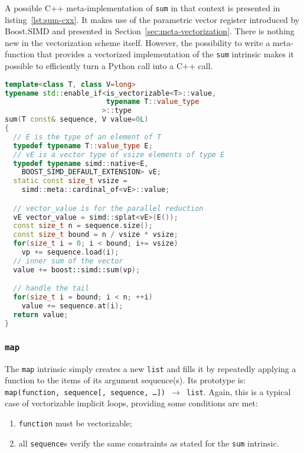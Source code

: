 \documentclass[preprint]{sigplanconf}
\begin{document}
A possible C++ meta-implementation of \texttt{sum} in that context is presented
in listing~\ref{lst:sum-cxx}. It makes use of the parametric vector register
introduced by Boost.SIMD and presented in Section~\ref{sec:meta-vectorization}.
There is nothing new in the vectorization scheme itself. However, the
possibility to write a meta-function that provides a vectorized implementation
of the \texttt{sum} intrinsic makes it possible to efficiently turn a Python
call into a C++ call.

\begin{lstlisting}[language=c++, label={lst:sum-cxx}, caption={Meta-implementation of the \texttt{sum} intrinsic in C++11.}]
template<class T, class V=long>
typename std::enable_if<is_vectorizable<T>::value,
                        typename T::value_type
                       >::type
sum(T const& sequence, V value=0L)
{
  // E is the type of an element of T
  typedef typename T::value_type E;
  // vE is a vector type of vsize elements of type E
  typedef typename simd::native<E,
    BOOST_SIMD_DEFAULT_EXTENSION> vE;
  static const size_t vsize =
    simd::meta::cardinal_of<vE>::value;

  // vector_value is for the parallel reduction
  vE vector_value = simd::splat<vE>(E());
  const size_t n = sequence.size();
  const size_t bound = n / vsize * vsize;
  for(size_t i = 0; i < bound; i+= vsize)
    vp += sequence.load(i);
  // inner sum of the vector
  value += boost::simd::sum(vp);

  // handle the tail
  for(size_t i = bound; i < n; ++i)
    value += sequence.at(i);
  return value;
}
\end{lstlisting}

\subsubsection{\texttt{map}}

The \texttt{map} intrinsic simply creates a new \texttt{list} and fills it by
repeatedly applying a function to the items of its argument sequence(s). Its
prototype is: \texttt{map(function, sequence[, sequence, \dots]) $\rightarrow$
list}. Again, this is a typical case of vectorizable implicit loops, providing
some conditions are met:

\begin{enumerate}

    \item[\label{enu:pure}] \texttt{function} must be vectorizable;
    \item[\label{enu:sequence}] all \texttt{sequence}s verify the same constraints as stated for the \texttt{sum} intrinsic.

\end{enumerate}
\end{document}
